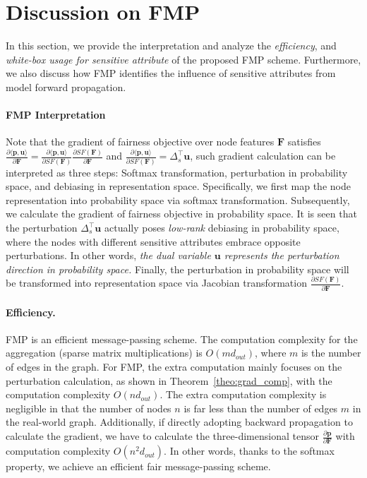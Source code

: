 \documentclass[letterpaper]{article} %
\theoremstyle{plain}
\theoremstyle{definition}
\theoremstyle{remark}
\begin{document}
\section{Discussion on FMP}
In this section, we provide the interpretation and analyze the \emph{efficiency}, and \emph{white-box usage for sensitive attribute} of the proposed FMP scheme. Furthermore, we also discuss how FMP identifies the influence of sensitive attributes from model forward propagation.

\paragraph{FMP Interpretation} Note that the gradient of fairness objective over node features $\mathbf{F}$ satisfies $\frac{\partial \langle \mathbf{p}, \mathbf{u}\rangle}{\partial \mathbf{F}}=\frac{\partial \langle \mathbf{p}, \mathbf{u}\rangle}{\partial SF(\mathbf{F})}\frac{\partial SF(\mathbf{F})}{\partial \mathbf{F}}$ and $\frac{\partial \langle \mathbf{p}, \mathbf{u}\rangle}{\partial SF(\mathbf{F})}=\Delta_s^{\top}\mathbf{u}$, such gradient calculation can be interpreted as three steps: Softmax transformation, perturbation in probability space, and debiasing in representation space. Specifically, we first map the node representation into probability space via softmax transformation. Subsequently, we calculate the gradient of fairness objective in probability space. It is seen that the perturbation $\Delta_s^{\top}\mathbf{u}$ actually poses \emph{low-rank} debiasing in probability space, where the nodes with different sensitive attributes embrace opposite perturbations. In other words, \emph{the dual variable $\mathbf{u}$ represents the perturbation direction in probability space.}
Finally, the perturbation in probability space will be transformed into representation space via Jacobian transformation $\frac{\partial SF(\mathbf{F})}{\partial \mathbf{F}}$.

\paragraph{Efficiency.} FMP is an efficient message-passing scheme. The computation complexity for the aggregation (sparse matrix multiplications) is $O(md_{out})$, where $m$ is the number of edges in the graph.
For FMP, the extra computation mainly focuses on the perturbation calculation, as shown in Theorem~\ref{theo:grad_comp}, with the computation complexity $O(nd_{out})$. The extra computation complexity is negligible in that the number of nodes $n$ is far less than the number of edges $m$ in the real-world graph. Additionally, if directly adopting backward propagation to calculate the gradient, we have to calculate the three-dimensional tensor $\frac{\partial \mathbf{p}}{\partial \mathbf{F}}$ with computation complexity $O(n^2d_{out})$. In other words,
thanks to the softmax property, we achieve an efficient fair message-passing scheme.
\end{document}
